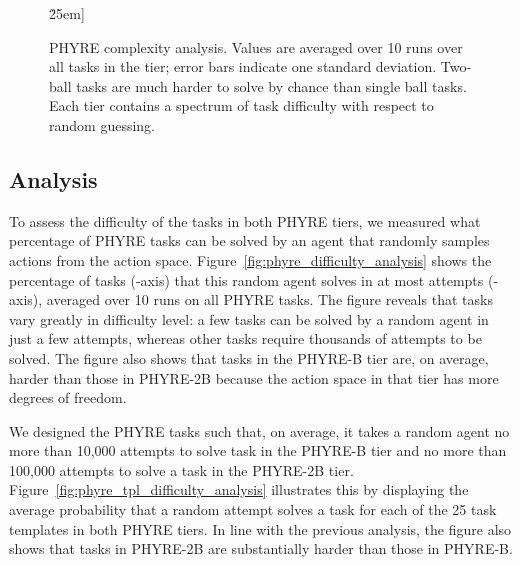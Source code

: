 \documentclass{article}
\begin{document}
\begin{figure*}[!t]\centering
{}
\hspace{6mm}
\.25em]
\caption{PHYRE complexity analysis. Values are averaged over 10 runs over all tasks in the tier; error bars indicate one standard deviation. Two-ball tasks are much harder to solve by chance than single ball tasks. Each tier contains a spectrum of task difficulty with respect to random guessing.}
\vspace{-3mm}
\end{figure*}


\subsection{Analysis}
\label{sec:phyre_analysis}
To assess the difficulty of the tasks in both PHYRE tiers, we measured what percentage of PHYRE tasks can be solved by an agent that randomly samples actions from the action space. Figure~\ref{fig:phyre_difficulty_analysis} shows the percentage of tasks (-axis) that this random agent solves in at most  attempts (-axis), averaged over 10 runs on all PHYRE tasks. The figure reveals that tasks vary greatly in difficulty level: a few tasks can be solved by a random agent in just a few attempts, whereas other tasks require thousands of attempts to be solved. The figure also shows that tasks in the PHYRE-B tier are, on average, harder than those in PHYRE-2B because the action space in that tier has more degrees of freedom.

We designed the PHYRE tasks such that, on average, it takes a random agent no more than 10,000 attempts to solve task in the PHYRE-B tier and no more than 100,000 attempts to solve a task in the PHYRE-2B tier. Figure~\ref{fig:phyre_tpl_difficulty_analysis} illustrates this by displaying the average probability that a random attempt solves a task for each of the 25 task templates in both PHYRE tiers. In line with the previous analysis, the figure also shows that tasks in PHYRE-2B are substantially harder than those in PHYRE-B.
 
\end{document}
